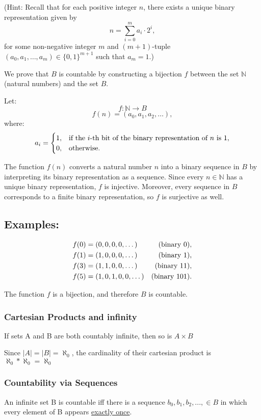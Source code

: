 \documentclass{article}
\begin{document}
(Hint: Recall that for each positive integer \( n \), there exists a unique binary representation given by 
\[
n = \sum_{i=0}^m a_i \cdot 2^i,
\]
for some non-negative integer \( m \) and \( (m+1) \)-tuple \( (a_0, a_1, \dots, a_m) \in \{0, 1\}^{m+1} \) such that \( a_m = 1 \).)

We prove that \( B \) is countable by constructing a bijection \( f \) between the set \( \mathbb{N} \) (natural numbers) and the set \( B \).

Let:
\[
f: \mathbb{N} \to B
\]
\[
f(n) = (a_0, a_1, a_2, \dots),
\]
where:
\[
a_i = 
\begin{cases} 
1, & \text{if the \( i \)-th bit of the binary representation of \( n \) is \( 1 \)}, \\
0, & \text{otherwise}.
\end{cases}
\]

The function \( f(n) \) converts a natural number \( n \) into a binary sequence in \( B \) by interpreting its binary representation as a sequence. Since every \( n \in \mathbb{N} \) has a unique binary representation, \( f \) is injective. Moreover, every sequence in \( B \) corresponds to a finite binary representation, so \( f \) is surjective as well.

\subsection*{Examples:}
\begin{align*}
f(0) &= (0, 0, 0, 0, \dots) & \text{(binary \( 0 \))}, \\
f(1) &= (1, 0, 0, 0, \dots) & \text{(binary \( 1 \))}, \\
f(3) &= (1, 1, 0, 0, \dots) & \text{(binary \( 11 \))}, \\
f(5) &= (1, 0, 1, 0, 0, \dots) & \text{(binary \( 101 \))}.
\end{align*}

The function \( f \) is a bijection, and therefore \( B \) is countable.


\subsubsection{Cartesian Products and infinity}
If sets A and B are both countably infinite, then so is $A \times B$

Since $\mid A \mid = \mid B \mid = \aleph_0$, the cardinality of their cartesian product is $\aleph_0 * \aleph_0 = \aleph_0$

\subsubsection{Countability via Sequences}
An infinite set B is countable iff there is a sequence $b_0,b_1,b_2,...,\in B$ in which every element of B appears \underline{exactly once}.
\end{document}

